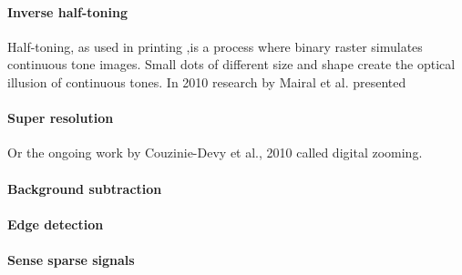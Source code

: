 
\paragraph{Inverse half-toning} Half-toning, as used in printing ,is a process
where binary raster simulates continuous tone images. Small dots of different
size and shape create the optical illusion of continuous tones. In 2010 research
by Mairal et al.\cite{Mairal2010b} presented 


\paragraph{Super resolution} \cite{Wright2008,Yang2010, Yang2010}  
Or the ongoing work by Couzinie-Devy et al., 2010 called digital zooming.

\paragraph{Background subtraction}\cite{}

\paragraph{Edge detection}\cite{Mairal2008c}

\paragraph{Sense sparse signals}\cite{Duarte2009}







